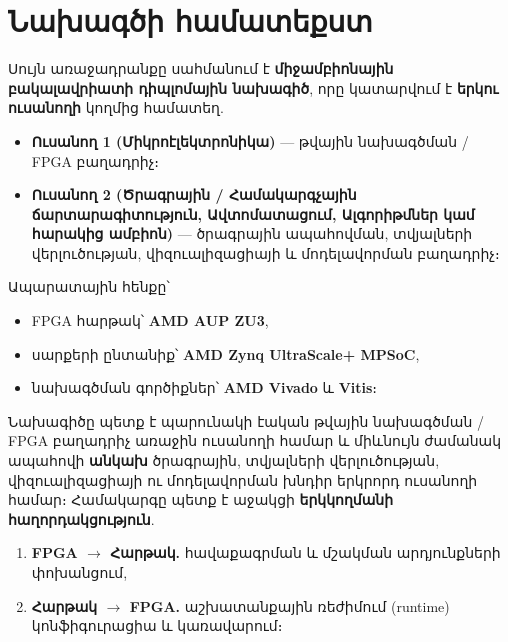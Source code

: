 \chapter{Նախագծի համատեքստ}

Սույն առաջադրանքը սահմանում է \textbf{միջամբիոնային բակալավրիատի դիպլոմային
նախագիծ}, որը կատարվում է \textbf{երկու ուսանողի} կողմից համատեղ.

\begin{itemize}[leftmargin=1.4em]
  \item \textbf{Ուսանող 1 (Միկրոէլեկտրոնիկա)} — թվային նախագծման / FPGA բաղադրիչ։
  \item \textbf{Ուսանող 2 (Ծրագրային / Համակարգչային ճարտարագիտություն,
        Ավտոմատացում, Ալգորիթմներ կամ հարակից ամբիոն)} — ծրագրային ապահովման,
        տվյալների վերլուծության, վիզուալիզացիայի և մոդելավորման բաղադրիչ։
\end{itemize}

Ապարատային հենքը՝
\begin{itemize}[leftmargin=1.4em]
  \item FPGA հարթակ՝ \textbf{AMD AUP ZU3},
  \item սարքերի ընտանիք՝ \textbf{AMD Zynq UltraScale+ MPSoC},
  \item նախագծման գործիքներ՝ \textbf{AMD Vivado} և \textbf{Vitis}։
\end{itemize}

Նախագիծը պետք է պարունակի էական թվային նախագծման / FPGA բաղադրիչ առաջին ուսանողի
համար և միևնույն ժամանակ ապահովի \textbf{անկախ} ծրագրային, տվյալների վերլուծության,
վիզուալիզացիայի ու մոդելավորման խնդիր երկրորդ ուսանողի համար։ Համակարգը պետք է
աջակցի \textbf{երկկողմանի հաղորդակցություն}.

\begin{enumerate}[leftmargin=1.6em]
  \item \textbf{FPGA $\rightarrow$ Հարթակ.} հավաքագրման և մշակման արդյունքների փոխանցում,
  \item \textbf{Հարթակ $\rightarrow$ FPGA.} աշխատանքային ռեժիմում (runtime) կոնֆիգուրացիա և կառավարում։
\end{enumerate}
